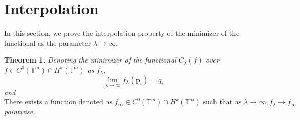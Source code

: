 \documentclass[multixcb]{amstext-l}
\theoremstyle{plain}
\newtheorem{theorem}{Theorem}[chapter]
\theoremstyle{definition}
\theoremstyle{definition}
\theoremstyle{remark}
\numberwithin{equation}{chapter}
\begin{document}
\section{Interpolation}
\label{proof_inter_sec}

In this section, we prove the interpolation property of the minimizer of the functional as the parameter $\lambda\to\infty$. 
\begin{theorem}\label{interpolation theorem}Denoting the minimizer of the functional $C_{\lambda}(f)$ over $f \in C^0(\mathbb{T}^m)\cap H^k(\mathbb{T}^m)$ as $f_{\lambda}$,
\begin{equation}\label{eq35}\lim\limits_{\lambda \to \infty} f_{\lambda}(\boldsymbol{p}_i) = q_i\end{equation} and  \begin{equation}\label{eq36}\mbox{There exists a function denoted as }f_{\infty} \in C^0(\mathbb{T}^m)\cap H^k(\mathbb{T}^m) \mbox{ such that as }\lambda\to\infty, f_{\lambda} \to f_{\infty}\end{equation} pointwise.
\end{theorem}
\end{document}
